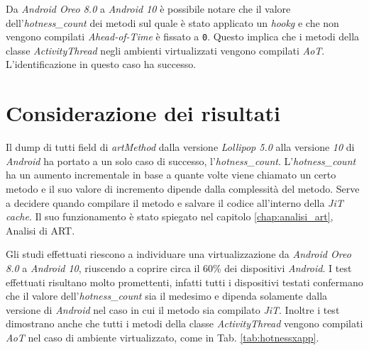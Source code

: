 Da \emph{Android Oreo 8.0} a \emph{Android 10} è possibile notare che il valore dell'\emph{hotness\_count} dei metodi sul quale è stato applicato un \emph{\gls{hookg}} e che non vengono compilati \emph{Ahead-of-Time} è fissato a \texttt{0}.
Questo implica che i metodi della classe \emph{ActivityThread} negli ambienti virtualizzati vengono compilati \emph{AoT}. L'identificazione in questo caso ha successo.


\section{Considerazione dei risultati}

Il dump di tutti field di \emph{artMethod} dalla versione \emph{Lollipop 5.0} alla versione \emph{10} di \emph{Android} ha portato a un solo caso di successo, l'\emph{hotness\_count}.
L'\emph{hotness\_count} ha un aumento incrementale in base a quante volte viene chiamato un certo metodo e il suo valore di incremento dipende dalla complessità del metodo. Serve a decidere quando compilare il metodo e salvare il codice all'interno della \emph{JiT cache}. Il suo funzionamento è stato spiegato nel capitolo \ref{chap:analisi_art}, Analisi di ART.

Gli studi effettuati riescono a individuare una virtualizzazione da \emph{Android Oreo 8.0} a \emph{Android 10}, riuscendo a coprire circa il 60\% dei dispositivi \emph{Android}. 
 I test effettuati risultano molto promettenti, infatti tutti i dispositivi testati confermano che il valore dell'\emph{hotness\_count} sia il medesimo e dipenda solamente dalla versione di \emph{Android} nel caso in cui il metodo sia compilato \emph{JiT}. Inoltre i test dimostrano anche che tutti i metodi della classe \emph{ActivityThread} vengono compilati \emph{AoT} nel caso di ambiente virtualizzato, come in Tab. \ref{tab:hotnessxapp}.


